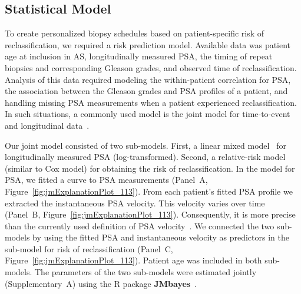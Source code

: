 \subsection{Statistical Model}
To create personalized biopsy schedules based on patient-specific risk of reclassification, we required a risk prediction model. Available data was patient age at inclusion in AS, longitudinally measured PSA, the timing of repeat biopsies and corresponding Gleason grades, and observed time of reclassification. Analysis of this data required modeling the within-patient correlation for PSA, the association between the Gleason grades and PSA profiles of a patient, and handling missing PSA measurements when a patient experienced reclassification. In such situations, a commonly used model is the joint model for time-to-event and longitudinal data~\citep{tomer2019,coley2017prediction,rizopoulos2012joint}.

Our joint model consisted of two sub-models. First, a linear mixed model~\citep{laird1982random} for longitudinally measured PSA (log-transformed). Second, a relative-risk model (similar to Cox model) for obtaining the risk of reclassification. In the model for PSA, we fitted a curve to PSA measurements (Panel~A, Figure~\ref{fig:jmExplanationPlot_113}). From each patient's fitted PSA profile we extracted the instantaneous PSA velocity. This velocity varies over time (Panel~B, Figure~\ref{fig:jmExplanationPlot_113}). Consequently, it is more precise than the currently used definition of PSA velocity~\citep{vickers2009psavelocity}. We connected the two sub-models by using the fitted PSA and instantaneous velocity as predictors in the sub-model for risk of reclassification (Panel~C, Figure~\ref{fig:jmExplanationPlot_113}). Patient age was included in both sub-models. The parameters of the two sub-models were estimated jointly (Supplementary~A) using the R package \textbf{JMbayes}~\citep{rizopoulosJMbayes}. 

